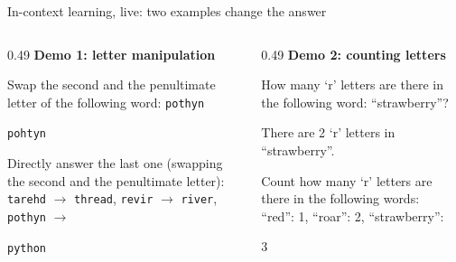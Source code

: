 \begin{frame}{In-context learning, live: two examples change the answer}
\begin{columns}[T]
\begin{column}{0.49\textwidth}
\textbf{Demo 1: letter manipulation}
\begin{userbox}Swap the second and the penultimate letter of the following word: \texttt{pothyn}\end{userbox}
\begin{modelbox}[badred]\texttt{pohtyn} \quad \bad\end{modelbox}
\begin{userbox}Directly answer the last one (swapping the second and the penultimate letter):\\ \texttt{tarehd} $\to$ \texttt{thread}, \; \texttt{revir} $\to$ \texttt{river}, \; \texttt{pothyn} $\to$\end{userbox}
\begin{modelbox}[okgreen]\texttt{python} \quad \ok\end{modelbox}
\end{column}
\begin{column}{0.49\textwidth}
\textbf{Demo 2: counting letters}
\begin{userbox}How many `r' letters are there in the following word: ``strawberry''?\end{userbox}
\begin{modelbox}[badred]There are 2 `r' letters in ``strawberry''. \quad \bad\end{modelbox}
\begin{userbox}Count how many `r' letters are there in the following words:\\ ``red'': 1, \; ``roar'': 2, \; ``strawberry'':\end{userbox}
\begin{modelbox}[okgreen]3 \quad \ok\end{modelbox}
\end{column}
\end{columns}
\vspace{6pt}
\centering\small{}
\end{frame}

